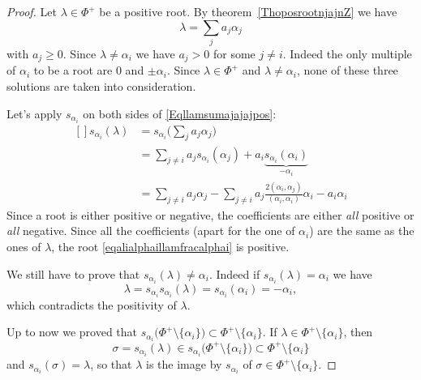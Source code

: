 \begin{proof}
	Let \( \lambda\in\Phi^+\) be a positive root. By theorem~\ref{ThoposrootnjajnZ} we have
	\begin{equation}        \label{Eqllamsumajajajpos}
		\lambda=\sum_ja_j\alpha_j
	\end{equation}
	with \( a_j\geq 0\). Since \( \lambda\neq\alpha_i\) we have \( a_j>0\) for some \( j\neq i\). Indeed the only multiple of \( \alpha_i\) to be a root are \( 0\) and \( \pm\alpha_i\). Since \( \lambda\in\Phi^+\) and \( \lambda\neq \alpha_i\), none of these three solutions are taken into consideration.

	Let's apply \( s_{\alpha_i}\) on both sides of \eqref{Eqllamsumajajajpos}:
	\begin{equation}        \label{eqalialphaillamfracalphai}
		\begin{aligned}[]
			s_{\alpha_i}(\lambda) & =s_{\alpha_i}\big( \sum_ja_j\alpha_j \big)                                                                           \\
			                      & =\sum_{j\neq i}a_js_{\alpha_i}(\alpha_j)+a_i\underbrace{s_{\alpha_i}(\alpha_i)}_{-\alpha_i}                          \\
			                      & =\sum_{j\neq i}a_j\alpha_j-\sum_{j\neq i}a_j\frac{ 2(\alpha_i,\alpha_j) }{ (\alpha_i,\alpha_i) }\alpha_i-a_i\alpha_i
		\end{aligned}
	\end{equation}
	Since a root is either positive or negative, the coefficients are either \emph{all} positive or \emph{all} negative. Since all the coefficients (apart for the one of \( \alpha_i\)) are the same as the ones of \( \lambda\), the root \eqref{eqalialphaillamfracalphai} is positive.

	We still have to prove that \( s_{\alpha_i}(\lambda)\neq \alpha_i\). Indeed if \( s_{\alpha_i}(\lambda)=\alpha_i\) we have
	\begin{equation}
		\lambda=s_{\alpha_i}s_{\alpha_i}(\lambda)=s_{\alpha_i}(\alpha_i)=-\alpha_i,
	\end{equation}
	which contradicts the positivity of \( \lambda\).

	Up to now we proved that \( s_{\alpha_i}\big( \Phi^+\setminus\{ \alpha_i \} \big)\subset\Phi^+\setminus\{ \alpha_i \}\). If \( \lambda\in\Phi^+\setminus\{ \alpha_i \}\), then
	\begin{equation}
		\sigma=s_{\alpha_i}(\lambda)\in s_{\alpha_i}\big( \Phi^+\setminus\{ \alpha_i \} \big)\subset\Phi^+\setminus\{ \alpha_i \}
	\end{equation}
	and \( s_{\alpha_i}(\sigma)=\lambda\), so that \( \lambda\) is the image by \( s_{\alpha_i}\) of \( \sigma\in\Phi^+\setminus\{ \alpha_i \}\).
\end{proof}

